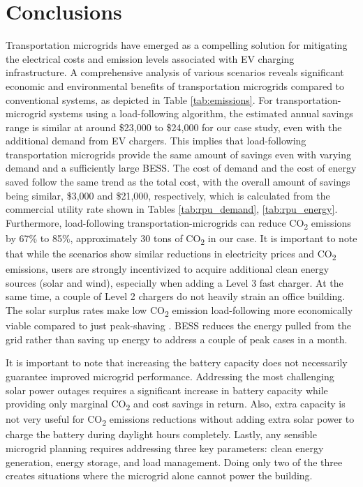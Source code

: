 \documentclass[conference,  usletter]{IEEEtran}
\begin{document}
\section{Conclusions}
Transportation microgrids have emerged as a compelling solution for mitigating the electrical costs and emission levels associated with EV charging infrastructure. A comprehensive analysis of various scenarios reveals significant economic and environmental benefits of transportation microgrids compared to conventional systems, as depicted in  Table \ref{tab:emissions}. For transportation-microgrid systems using a load-following algorithm, the estimated annual savings range is similar at around \$23,000 to \$24,000 for our case study, even with the additional demand from EV chargers. This implies that load-following transportation microgrids provide the same amount of savings even with varying demand and a sufficiently large BESS. The cost of demand and the cost of energy saved follow the same trend as the total cost, with the overall amount of savings being similar, \$3,000 and \$21,000, respectively, which is calculated from the commercial utility rate shown in Tables \ref{tab:rpu_demand}, \ref{tab:rpu_energy}.
Furthermore, load-following transportation-microgrids can reduce CO\textsubscript{2} emissions by 67\% to 85\%, approximately 30 tons of CO\textsubscript{2} in our case. It is important to note that while the scenarios show similar reductions in electricity prices and CO\textsubscript{2} emissions, users are strongly incentivized to acquire additional clean energy sources (solar and wind), especially when adding a Level 3 fast charger. At the same time, a couple of Level 2 chargers do not heavily strain an office building. The solar surplus rates make low CO\textsubscript{2} emission load-following more economically viable compared to just peak-shaving \cite{rpu_nem}. BESS reduces the energy pulled from the grid rather than saving up energy to address a couple of peak cases in a month.

It is important to note that increasing the battery capacity does not necessarily guarantee improved microgrid performance. Addressing the most challenging solar power outages requires a significant increase in battery capacity while providing only marginal CO\textsubscript{2} and cost savings in return. Also, extra capacity is not very useful for CO\textsubscript{2} emissions reductions without adding extra solar power to charge the battery during daylight hours completely. Lastly, any sensible microgrid planning requires addressing three key parameters: clean energy generation, energy storage, and load management. Doing only two of the three creates situations where the microgrid alone cannot power the building.
\end{document}

